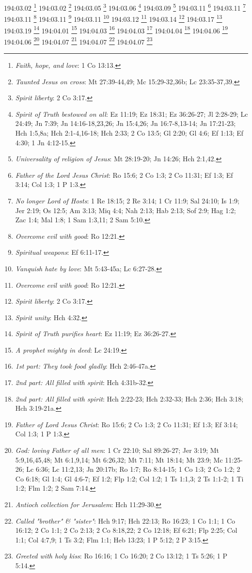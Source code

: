 194:03.02 \footnote{\textit{Faith, hope, and love}: 1 Co 13:13.}
194:03.02 \footnote{\textit{Taunted Jesus on cross}: Mt 27:39-44,49; Mc 15:29-32,36b; Lc 23:35-37,39.}
194:03.05 \footnote{\textit{Spirit liberty}: 2 Co 3:17.}
194:03.06 \footnote{\textit{Spirit of Truth bestowed on all}: Ez 11:19; Ez 18:31; Ez 36:26-27; Jl 2:28-29; Lc 24:49; Jn 7:39; Jn 14:16-18,23,26; Jn 15:4,26; Jn 16:7-8,13-14; Jn 17:21-23; Hch 1:5,8a; Hch 2:1-4,16-18; Hch 2:33; 2 Co 13:5; Gl 2:20; Gl 4:6; Ef 1:13; Ef 4:30; 1 Jn 4:12-15.}
194:03.09 \footnote{\textit{Universality of religion of Jesus}: Mt 28:19-20; Jn 14:26; Hch 2:1,42.}
194:03.11 \footnote{\textit{Father of the Lord Jesus Christ}: Ro 15:6; 2 Co 1:3; 2 Co 11:31; Ef 1:3; Ef 3:14; Col 1:3; 1 P 1:3.}
194:03.11 \footnote{\textit{No longer Lord of Hosts}: 1 Re 18:15; 2 Re 3:14; 1 Cr 11:9; Sal 24:10; Is 1:9; Jer 2:19; Os 12:5; Am 3:13; Miq 4:4; Nah 2:13; Hab 2:13; Sof 2:9; Hag 1:2; Zac 1:4; Mal 1:8; 1 Sam 1:3,11; 2 Sam 5:10.}
194:03.11 \footnote{\textit{Overcome evil with good}: Ro 12:21.}
194:03.11 \footnote{\textit{Spiritual weapons}: Ef 6:11-17.}
194:03.11 \footnote{\textit{Vanquish hate by love}: Mt 5:43-45a; Lc 6:27-28.}
194:03.12 \footnote{\textit{Overcome evil with good}: Ro 12:21.}
194:03.14 \footnote{\textit{Spirit liberty}: 2 Co 3:17.}
194:03.17 \footnote{\textit{Spirit unity}: Hch 4:32.}
194:03.19 \footnote{\textit{Spirit of Truth purifies heart}: Ez 11:19; Ez 36:26-27.}
194:04.01 \footnote{\textit{A prophet mighty in deed}: Lc 24:19.}
194:04.03 \footnote{\textit{1st part: They took food gladly}: Hch 2:46-47a.}
194:04.03 \footnote{\textit{2nd part: All filled with spirit}: Hch 4:31b-32.}
194:04.04 \footnote{\textit{2nd part: All filled with spirit}: Hch 2:22-23; Hch 2:32-33; Hch 2:36; Hch 3:18; Hch 3:19-21a.}
194:04.06 \footnote{\textit{Father of Lord Jesus Christ}: Ro 15:6; 2 Co 1:3; 2 Co 11:31; Ef 1:3; Ef 3:14; Col 1:3; 1 P 1:3.}
194:04.06 \footnote{\textit{God: loving Father of all men}: 1 Cr 22:10; Sal 89:26-27; Jer 3:19; Mt 5:9,16,45,48; Mt 6:1,9,14; Mt 6:26,32; Mt 7:11; Mt 18:14; Mt 23:9; Mc 11:25-26; Lc 6:36; Lc 11:2,13; Jn 20:17b; Ro 1:7; Ro 8:14-15; 1 Co 1:3; 2 Co 1:2; 2 Co 6:18; Gl 1:4; Gl 4:6-7; Ef 1:2; Flp 1:2; Col 1:2; 1 Ts 1:1,3; 2 Ts 1:1-2; 1 Ti 1:2; Flm 1:2; 2 Sam 7:14.}
194:04.07 \footnote{\textit{Antioch collection for Jerusalem}: Hch 11:29-30.}
194:04.07 \footnote{\textit{Called "brother" & "sister"}: Hch 9:17; Hch 22:13; Ro 16:23; 1 Co 1:1; 1 Co 16:12; 2 Co 1:1; 2 Co 2:13; 2 Co 8:18,22; 2 Co 12:18; Ef 6:21; Flp 2:25; Col 1:1; Col 4:7,9; 1 Ts 3:2; Flm 1:1; Heb 13:23; 1 P 5:12; 2 P 3:15.}
194:04.07 \footnote{\textit{Greeted with holy kiss}: Ro 16:16; 1 Co 16:20; 2 Co 13:12; 1 Ts 5:26; 1 P 5:14.}

